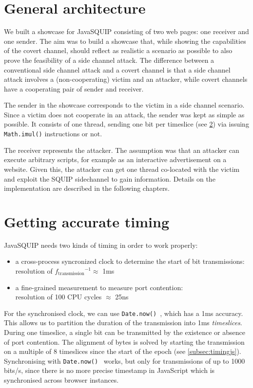 \documentclass[11pt,
  titlepage=false,
]{scrreprt}
\begin{document}
\section{General architecture}
\label{sec:general-architecture}
We built a showcase for JavaSQUIP consisting of two web pages: one receiver and one sender.
The aim was to build a showcase that, while showing the capabilities of the covert channel,
should reflect as realistic a scenario as possible to also prove the feasibility of a side channel attack.
The difference between a conventional side channel attack and a covert channel is that a side channel attack involves a (non-cooperating) victim and
an attacker, while covert channels have a cooperating pair of sender and receiver.

The sender in the showcase corresponds to the victim in a side channel scenario.
Since a victim does not cooperate in an attack, the sender was kept as simple as possible.
It consists of one thread, sending one bit per timeslice (see \ref{sec:accurate-timing}) via issuing \texttt{Math.imul()} instructions or not.

The receiver represents the attacker.
The assumption was that an attacker can execute arbitrary scripts, for example as an interactive advertisement on a website.
Given this, the attacker can get one thread co-located with the victim and exploit the SQUIP sidechannel to gain information.
Details on the implementation are described in the following chapters.

\section{Getting accurate timing}
\label{sec:accurate-timing}
JavaSQUIP needs two kinds of timing in order to work properly:
\begin{itemize}
    \item a cross-process syncronized clock to determine the start of bit transmissions:\\
    resolution of ${f_{\text{transmission}}}^{-1} \approx$ 1ms
    \item a fine-grained measurement to measure port contention:\\
    resolution of 100 CPU cycles $\approx$ 25ns
\end{itemize}

For the synchronised clock, we can use \texttt{Date.now()}~\cite{datenow}, which has a 1ms accuracy.
This allows us to partition the duration of the transmission into 1ms \textit{timeslices}.
During one timeslice, a single bit can be transmitted by the existence or absence of port contention.
The alignment of bytes is solved by starting the transmission on a multiple of 8 timeslices since the start of the epoch (see \ref{subsec:timingjs}).
Synchronising with \texttt{Date.now()}~\cite{datenow} works, but only for transmissions of up to 1000 bits/s,
since there is no more precise timestamp in JavaScript which is synchronised across browser instances.
\end{document}
